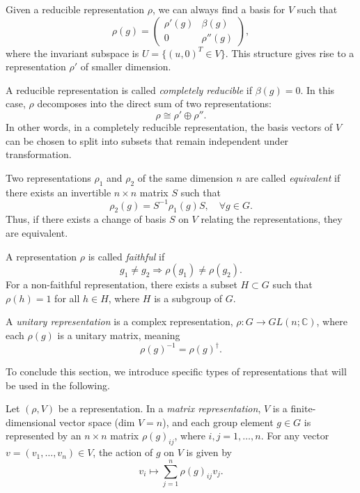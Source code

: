 Given a reducible representation $\rho$, we can always find a basis for $V$ such that
\[
\rho(g) = \begin{pmatrix} \rho'(g) & \beta(g) \\ 0 & \rho''(g) \end{pmatrix},
\]
where the invariant subspace is $U = \{(u, 0)^T \in V\}$. This structure gives rise to a representation $\rho'$ of smaller dimension.

\begin{definition}
A reducible representation is called \emph{completely reducible} if $\beta(g) = 0$. In this case, $\rho$ decomposes into the direct sum of two representations:
\[
\rho \cong \rho' \oplus \rho''.
\]
In other words, in a completely reducible representation, the basis vectors of $V$ can be chosen to split into subsets that remain independent under transformation.
\end{definition}

\begin{definition}
Two representations $\rho_1$ and $\rho_2$ of the same dimension $n$ are called \emph{equivalent} if there exists an invertible $n \times n$ matrix $S$ such that
\[
\rho_2(g) = S^{-1} \rho_1(g) S, \quad \forall g \in G.
\]
Thus, if there exists a change of basis $S$ on $V$ relating the representations, they are equivalent.
\end{definition}

\begin{definition}
A representation $\rho$ is called \emph{faithful} if
\[
g_1 \neq g_2 \Rightarrow \rho(g_1) \neq \rho(g_2).
\]
For a non-faithful representation, there exists a subset $H \subset G$ such that $\rho(h) = 1$ for all $h \in H$, where $H$ is a subgroup of $G$.
\end{definition}

\begin{definition}
A \emph{unitary representation} is a complex representation, $\rho : G \to GL(n; \mathbb{C})$, where each $\rho(g)$ is a unitary matrix, meaning
\[
\rho(g)^{-1} = \rho(g)^{\dagger}.
\]
\end{definition}

To conclude this section, we introduce specific types of representations that will be used in the following.

\begin{definition}
Let $(\rho, V)$ be a representation. In a \emph{matrix representation}, $V$ is a finite-dimensional vector space (dim $V = n$), and each group element $g \in G$ is represented by an $n \times n$ matrix $\rho(g)_{ij}$, where $i, j = 1, \dots, n$. For any vector $v = (v_1, \dots, v_n) \in V$, the action of $g$ on $V$ is given by
\[
v_i \mapsto \sum_{j=1}^n \rho(g)_{ij} v_j.
\]
\end{definition}


